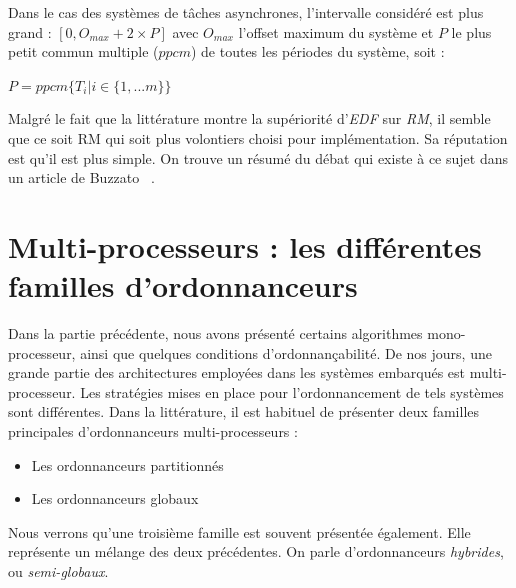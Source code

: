	Dans le cas des systèmes de tâches asynchrones, l'intervalle considéré est plus grand : 
	$[0, O_{max} + 2 \times P]$ avec $O_{max}$ l'offset maximum du système et 
	$P$ le plus petit commun multiple ($ppcm$) de toutes les périodes du système, soit : \medskip
	\begin{center}
		$P = ppcm\{T_i | i \in \{1, ... m\}\}$
	\end{center}
	
	Malgré le fait que la littérature montre la supériorité d'\textit{EDF} sur \textit{RM}, 
	il semble que ce soit RM qui soit plus volontiers choisi pour implémentation. 
	Sa réputation est qu'il est plus simple. 
	On trouve un résumé du débat qui existe à ce sujet dans un article de Buzzato~
	\cite{buttazzo_rate_2005}.
	
	\section{Multi-processeurs : les différentes familles d'ordonnanceurs}
	
	Dans la partie précédente, nous avons présenté certains algorithmes mono-processeur, 
	ainsi que quelques conditions d'ordonnançabilité.
	De nos jours, une grande partie des architectures employées dans les systèmes embarqués 
	est multi-processeur. 
	Les stratégies mises en place pour l'ordonnancement de tels 
	systèmes sont différentes. Dans la littérature, il est habituel de présenter 
	deux familles principales d'ordonnanceurs multi-processeurs :\medskip
	\begin{itemize}
		\item Les ordonnanceurs partitionnés
		\item Les ordonnanceurs globaux
	\end{itemize}
	Nous verrons qu'une troisième famille est souvent présentée également. Elle représente un 
	mélange des deux précédentes. On parle d'ordonnanceurs \textit{hybrides}, ou \textit{semi-globaux}.
	
